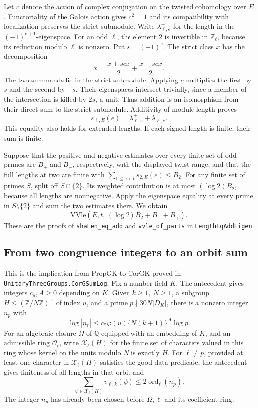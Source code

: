 Let \(c\) denote the action of complex conjugation on the twisted
cohomology over \(E\). Functoriality of the Galois action gives
\(c^2=1\) and its compatibility with localization preserves the strict
submodule. Write \(\lambda^-_{\ell,e}\) for the length in the
\((-1)^{e+1}\)-eigenspace. For an odd \(\ell\), the element \(2\)
is invertible in \(\mathbb Z_\ell\), because its reduction modulo
\(\ell\) is nonzero. Put \(s=(-1)^e\). The strict class \(x\) has the
decomposition
\[
        x=\frac{x+scx}{2}+\frac{x-scx}{2}.
\]
The two summands lie in the strict submodule. Applying \(c\) multiplies
the first by \(s\) and the second by \(-s\). Their eigenspaces intersect
trivially, since a member of the intersection is killed by \(2s\), a
unit. Thus addition is an isomorphism from their direct sum to the
strict submodule. Additivity of module length proves
\[
       s_{\ell,E}(e)=\lambda^+_{\ell,e}+\lambda^-_{\ell,e}.
\]
This equality also holds for extended lengths. If each signed length
is finite, their sum is finite.

Suppose that the positive and negative estimates over every finite set
of odd primes are \(B_+\) and \(B_-\), respectively, with the displayed
twist range, and that the full lengths at two are finite with
\(\sum_{1\le e<t}s_{2,E}(e)\le B_2\). For any finite set of primes
\(S\), split off \(S\cap\{2\}\). Its weighted contribution is at most
\((\log 2)B_2\), because all lengths are nonnegative. Apply the
eigenspace equality at every prime in \(S\setminus\{2\}\) and sum the
two estimates there. We obtain
\[
       \mathrm{VVle}(E,t,\,(\log 2)B_2+B_-+B_+).
\]
These are the proofs of \texttt{sha\allowbreak{}Len\_\allowbreak{}eq\_\allowbreak{}add} and
\texttt{vvle\_\allowbreak{}of\_\allowbreak{}parts} in \texttt{Length\allowbreak{}Eq\allowbreak{}Add\allowbreak{}Eigen}.

\subsection{From two congruence integers to an orbit sum}

This is the implication from \(\mathrm{PropGK}\) to \(\mathrm{CorGK}\)
proved in \texttt{Unitary\allowbreak{}Three\allowbreak{}Groups.\allowbreak{}Cor\allowbreak{}GSum\allowbreak{}Log}. Fix a number field
\(K\). The antecedent gives integers \(c_5,A\ge0\) depending on
\(K\). Given \(k\ge1,\ N\ge1\), a subgroup
\(H\le(\mathbb Z/N\mathbb Z)^\times\) of index \(u\), and a prime
\(p\nmid 30N|D_K|\), there is a nonzero integer \(n_p\) with
\[
   \log|n_p|\le c_5\varphi(u)\{N(k+1)\}^A\log p.
\]
For an algebraic closure \(\Omega\) of \(\mathbb Q\) equipped with an
embedding of \(K\), and an admissible ring \(\mathcal O_\ell\), write
\(\mathcal X_\ell(H)\) for the finite set of characters valued in this
ring whose kernel on the units modulo \(N\) is exactly \(H\).
For \(\ell\ne p\), provided at least one character in
\(\mathcal X_\ell(H)\) satisfies the good-data predicate, the
antecedent gives finiteness of all lengths in that orbit and
\[
       \sum_{\psi\in\mathcal X_\ell(H)}v_{\ell,k}(\psi)
               \le 2\operatorname{ord}_\ell(n_p).
\]
The integer \(n_p\) has already been chosen before \(\Omega,\ell\)
and its coefficient ring.

